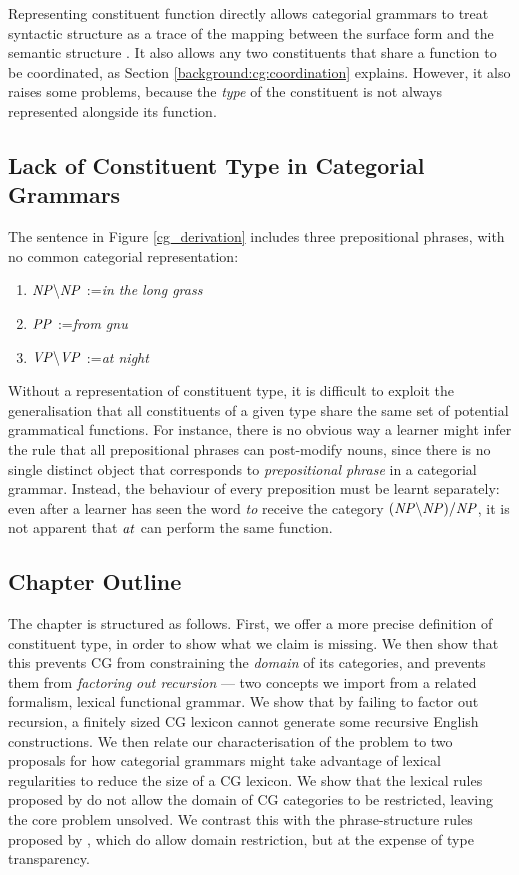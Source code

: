 \documentclass{article}
\newcommand{\cf}[1]{\mbox{$\it{#1}$}}   %
\newcommand{\assign}{:=\xspace}
\newcommand{\cg}{CG\xspace}
\begin{document}
Representing constituent function directly allows categorial grammars to treat syntactic structure as a trace of the mapping between the surface form and the semantic structure \citep{steedman96}. It also allows any two constituents that share a function to be coordinated, as Section \ref{background:cg:coordination} explains. However, it also raises some problems, because the \emph{type} of the constituent is not always represented alongside its function.

\subsection{Lack of Constituent Type in Categorial Grammars}

The sentence in Figure \ref{cg_derivation} includes three prepositional phrases, with no common categorial representation:

\begin{enumerate}
 \item \cf{NP\bs NP} \assign \emph{in the long grass}
 \item \cf{PP} \assign \emph{from gnu}
 \item \cf{VP\bs VP} \assign \emph{at night}
\end{enumerate}

Without a representation of constituent type, it is difficult to exploit the generalisation that all constituents of a given type share the same set of potential grammatical functions. For instance, there is no obvious way a learner might infer the rule that all prepositional phrases can post-modify nouns, since there is no single distinct object that corresponds to \emph{prepositional phrase} in a categorial grammar. Instead, the behaviour of every preposition must be learnt separately: even after a learner has seen the word \emph{to} receive the category \cf{(NP\bs NP)/NP}, it is not apparent that \cf{at} can perform the same function.

\subsection{Chapter Outline}

The chapter is structured as follows. First, we offer a more precise definition of constituent type, in order to show what we claim is missing. We then show that this prevents \cg from constraining the \emph{domain} of its categories, and prevents them from \emph{factoring out recursion} --- two concepts we import from a related formalism, lexical functional grammar. We show that by failing to factor out recursion, a finitely sized \cg lexicon cannot generate some recursive English constructions. We then relate our characterisation of the problem to two proposals for how categorial grammars might take advantage of lexical regularities to reduce the size of a \cg lexicon. We show that the lexical rules proposed by \citet{carpenter} do not allow the domain of \cg categories to be restricted, leaving the core problem unsolved. We contrast this with the phrase-structure rules proposed by \citet{ccgbank}, which do allow domain restriction, but at the expense of type transparency.
\end{document}
